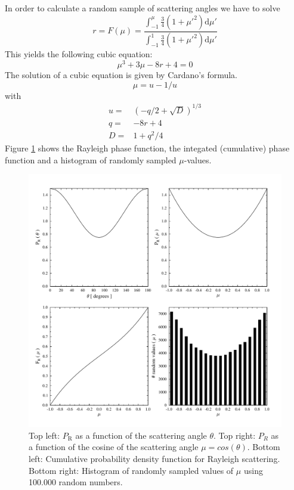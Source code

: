 \documentclass[12pt,twoside,a4paper]{article}
\newcommand{\DiffD}         {\ensuremath{\mathrm{d}}}
\begin{document}
In order to calculate a random sample of scattering angles we have to solve
\begin{equation}
  r= F(\mu) = \frac{\int_{-1}^{\mu} \frac{3}{4}(1+\mu'^2) \DiffD\mu'}
  {\int_{-1}^{1} \frac{3}{4}(1+\mu'^2) \DiffD\mu'}
\end{equation}
This yields the following cubic equation: 
\begin{equation}
  \label{eq:rayleigh_cubic}
  \mu^3 + 3\mu - 8 r + 4 = 0
\end{equation}
The solution of a cubic equation is given by Cardano's formula. 
\begin{equation}
  \mu = u - 1/u
\end{equation}
with 
\begin{eqnarray}
  u =& (-q/2 + \sqrt{D})^{1/3}\\
  q =& -8 r + 4\\
  D =& 1 + q^2/4
\end{eqnarray}
Figure \ref{fig:rayleigh} shows the Rayleigh phase function,
the integated (cumulative) phase
function and a histogram of randomly sampled $\mu$-values.
\begin{figure}[b!]
  \includegraphics[width=0.9\hsize]{../examples/rayleigh.pdf}
  \caption{Top left: $P_\mathrm{R}$ as a function of the scattering angle $\theta$. Top right: $P_R$ as a function of the cosine of the scattering angle $\mu=cos(\theta)$. Bottom left: Cumulative probability density function for Rayleigh scattering. Bottom right: Histogram of randomly sampled values of $\mu$ using 100.000 random numbers.} 
  \label{fig:rayleigh}
\end{figure}
\end{document}
